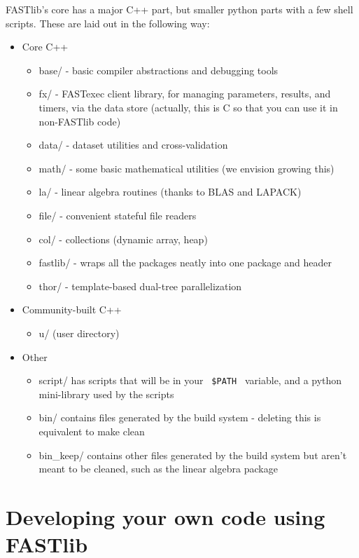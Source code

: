 \documentclass[letter]{report}
\begin{document}
FASTlib's core has a major C++ part, but smaller python parts with a few shell scripts. These are laid out in the following way:
\begin{itemize}
\item Core C++
  \begin{itemize}
  \item base/ - basic compiler abstractions and debugging tools
  \item fx/ - FASTexec client library, for managing parameters, results, and timers, via the data store (actually, this is C so that you can use it in non-FASTlib code)
  \item data/ - dataset utilities and cross-validation
  \item math/ - some basic mathematical utilities (we envision growing this)
  \item la/ - linear algebra routines (thanks to BLAS and LAPACK)
  \item file/ - convenient stateful file readers
  \item col/ - collections (dynamic array, heap)
  \item fastlib/ - wraps all the packages neatly into one package and header
  \item thor/ - template-based dual-tree parallelization 
  \end{itemize}
\item Community-built C++
  \begin {itemize}
  \item u/ (user directory)
\end {itemize} 
\item  Other
  \begin {itemize}
  \item script/ has scripts that will be in your \verb= $PATH = variable, and a python mini-library used by the scripts
  \item bin/ contains files generated by the build system - deleting this is equivalent to make clean
  \item bin\_keep/ contains other files generated by the build system but aren't meant to be cleaned, such as the linear algebra package 
  \end {itemize}
\end{itemize}

\section {Developing your own code using FASTlib}
 
\end{document}
